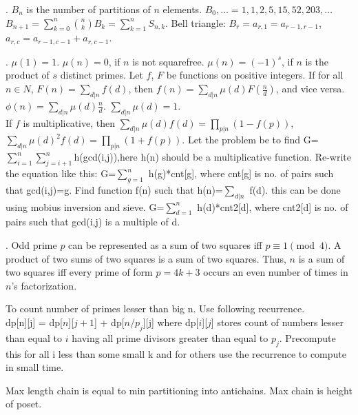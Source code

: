  
.
$B_n$ is the number of partitions of $n$ elements.
$B_0, \ldots = 1,1,2,5,15,52,203,\ldots$ \\
$B_{n+1} = \sum_{k=0}^n {n \choose k} B_k = \sum_{k=1}^n S_{n,k}$.
Bell triangle: $B_r=a_{r,1}=a_{r-1,r-1}$, $a_{r,c}=a_{r-1,c-1}+a_{r,c-1}$.
 
 
.
$\mu(1) = 1$. $\mu(n) = 0$, if $n$ is not squarefree.
$\mu(n) = (-1)^s$, if $n$ is the product of $s$ distinct primes.
Let $f$, $F$ be functions on positive integers.
If for all $n \in N$, $F(n)=\sum_{d|n} f(d)$, then $f(n) = \sum_{d|n} \mu(d) F(\frac{n}{d})$,
and vice versa. \quad
$\phi(n) = \sum_{d|n} \mu(d) \frac{n}{d}$.
\quad $\sum_{d|n} \mu(d) = 1$. \\
If $f$ is multiplicative, then $\sum_{d|n} \mu(d) f(d) = \prod_{p|n}(1-f(p))$,
$\sum_{d|n} \mu(d)^2 f(d) = \prod_{p|n} (1+f(p))$.
Let the problem be to find G=$\sum_{i=1}^n \sum_{j=i+1}^n $h(gcd(i,j)),here h(n) should be a multiplicative function.
Re-write the equation like this:  G=$\sum_{g=1}^n$ h(g)*cnt[g], where cnt[g] is no. of pairs such that gcd(i,j)=g.
Find function f(n) such that h(n)=$\sum_{d|n}$ f(d). this can be done using mobius inversion and sieve.
G=$\sum_{d=1}^n$ h(d)*cnt2[d], where cnt2[d] is no. of pairs such that gcd(i,j) is a multiple of d.
 
.  Odd prime $p$ can be represented
as a sum of two squares iff $p \equiv 1 {\pmod 4}$.
A product of two sums of two squares is a sum of two squares.
Thus, $n$ is a sum of two squares iff every prime of
form $p=4k+3$ occurs an even number of times in $n$'s factorization.
 
   To count number of primes lesser than big n. Use following recurrence. \\ dp[n][j] = dp[$n$][$j+1$] + dp[$n/p_{j}$][j]   where dp[$i$][$j$] stores count of numbers lesser than equal to $i$ having all prime divisors greater than equal to $p_{j}$. Precompute this for all i less than some small k and for others use the recurrence to compute in small time.

\vspace{-7mm}
\vspace{-3mm}
 Max length chain is equal to min partitioning into antichains. Max chain is height of poset.
\vspace{-3mm}
 
